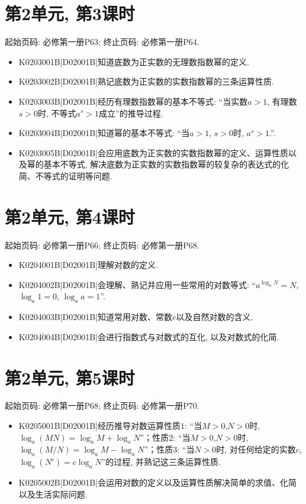 \section*{第2单元, 第3课时}
起始页码: 必修第一册P63; 终止页码: 必修第一册P64.
\begin{itemize}
\item K0203001B|D02001B|知道底数为正实数的无理数指数幂的定义.
\item K0203002B|D02001B|熟记底数为正实数的实数指数幂的三条运算性质.
\item K0203003B|D02001B|经历有理数指数幂的基本不等式: ``当实数$a>1$, 有理数$s>0$时, 不等式$a^s>1$成立''的推导过程.
\item K0203004B|D02001B|知道幂的基本不等式: ``当$a>1$, $s>0$时, $a^s>1$.''.
\item K0203005B|D02001B|会应用底数为正实数的实数指数幂的定义、运算性质以及幂的基本不等式, 解决底数为正实数的实数指数幂的较复杂的表达式的化简、不等式的证明等问题.
\end{itemize}

\section*{第2单元, 第4课时}
起始页码: 必修第一册P66; 终止页码: 必修第一册P68.
\begin{itemize}
\item K0204001B|D02001B|理解对数的定义.
\item K0204002B|D02001B|会理解、熟记并应用一些常用的对数等式: ``$a^{\log_aN}=N$, $\log_a1=0$, $\log_aa=1$''.
\item K0204003B|D02001B|知道常用对数、常数$e$以及自然对数的含义.
\item K0204004B|D02001B|会进行指数式与对数式的互化, 以及对数式的化简.
\end{itemize}

\section*{第2单元, 第5课时}
起始页码: 必修第一册P68; 终止页码: 必修第一册P70.
\begin{itemize}
\item K0205001B|D02001B|经历推导对数运算性质$1$: ``当$M>0$,$N>0$时, $\log_a(MN)=\log_aM+\log_aN$''；性质$2$: ``当$M>0$,$N>0$时, $\log_a(M/N)=\log_aM-\log_aN$''；性质$3$: ``当$N>0$时, 对任何给定的实数$c$, $\log_a(N^{c})=c\log_aN$''的过程, 并熟记这三条运算性质.
\item K0205002B|D02001B|会运用对数的定义以及运算性质解决简单的求值、化简以及生活实际问题.
\end{itemize}

